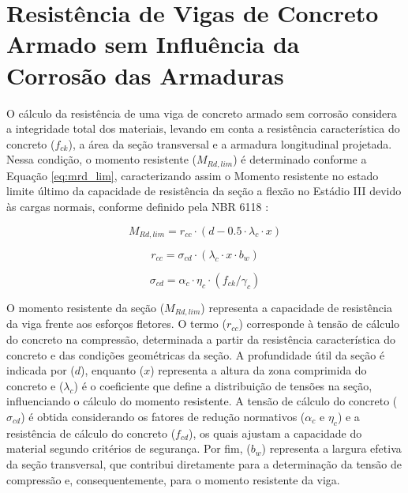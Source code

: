 \section{Resistência de Vigas de Concreto Armado sem Influência da Corrosão das Armaduras}

O cálculo da resistência de uma viga de concreto armado sem corrosão considera a integridade total dos materiais, levando em conta a resistência característica do concreto ($f_{ck}$), a área da seção transversal e a armadura longitudinal projetada. Nessa condição, o momento resistente ($M_{Rd,lim}$) é determinado conforme a Equação \eqref{eq:mrd_lim}, caracterizando assim o Momento resistente no estado limite último da capacidade de resistência da seção a flexão no Estádio III devido às cargas normais, conforme definido pela NBR 6118 \cite{associacao_brasileira_de_normas_tecnicas_nbr_2023}:

\begin{equation}\label{eq:mrd_lim}
M_{Rd,lim} = r_{cc} \cdot \left( d - 0.5 \cdot \lambda_c \cdot x \right)
\end{equation}

\begin{equation}\label{eq:r_cc}
r_{cc} = \sigma_{cd} \cdot \left( \lambda_c \cdot x \cdot b_w \right)
\end{equation}

\begin{equation}\label{eq:sigma_cd}
\sigma_{cd} = \alpha_c \cdot \eta_c \cdot (f_{ck}/\gamma_c)
\end{equation}

O momento resistente da seção ($M_{Rd,lim}$) representa a capacidade de resistência da viga frente aos esforços fletores. O termo ($r_{cc}$) corresponde à tensão de cálculo do concreto na compressão, determinada a partir da resistência característica do concreto e das condições geométricas da seção. A profundidade útil da seção é indicada por ($d$), enquanto ($x$) representa a altura da zona comprimida do concreto e ($\lambda_c$) é o coeficiente que define a distribuição de tensões na seção, influenciando o cálculo do momento resistente. A tensão de cálculo do concreto ($\sigma_{cd}$) é obtida considerando os fatores de redução normativos ($\alpha_c$ e $\eta_c$) e a resistência de cálculo do concreto ($f_{cd}$), os quais ajustam a capacidade do material segundo critérios de segurança. Por fim, ($b_w$) representa a largura efetiva da seção transversal, que contribui diretamente para a determinação da tensão de compressão e, consequentemente, para o momento resistente da viga.

